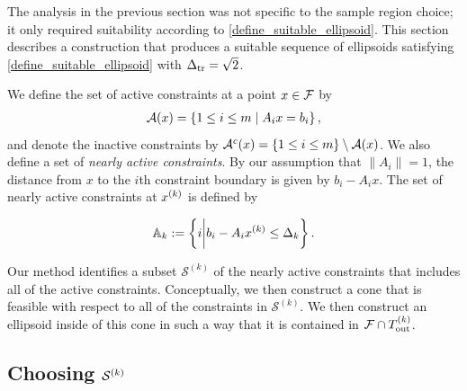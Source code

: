 \documentclass{article}
\begin{document}

The analysis in the previous section was not specific to the sample region choice; it only required suitability according to \cref{define_suitable_ellipsoid}.
This section describes a construction that produces a suitable sequence of ellipsoids satisfying \cref{define_suitable_ellipsoid} with $\Delta_{\textrm{tr}}=\sqrt{2}$.

We define the set of active constraints at a point $x \in {\mathcal F}$ by
\begin{align}
{\mathcal A}(x) = \left\{1 \le i \le m \; | \; {{A}}_ix = {{b}}_i \right\},\label{define_activei}
\end{align}
and denote the inactive constraints by ${\mathcal A}^c(x) = \left\{1 \le i \le m\right\} \setminus {\mathcal A}(x)$.   We also define a set of {\em nearly active constraints}.   By our assumption that $\|A_i\|=1$, the distance from $x$ to the $i$th constraint boundary is given by $b_i-A_i x$.  The set of nearly active constraints at $x^{(k)}$ is defined by

%
%
\begin{align}
{\mathbb A_{k}} := \left\{i \bigg| b_i-A_i x^{(k)} \le \Delta_k \right\}.
\label{define_activeconstraints}
\end{align}

Our method identifies a subset $\mathcal{S}^{(k)}$ of the nearly active constraints that includes all of the active constraints.   Conceptually,  we then construct a cone that is feasible with respect to all of the constraints in $\mathcal{S}^{(k)}$.   We then
construct an ellipsoid inside of this cone in such a way that it is contained in ${\mathcal F} \cap {T_{\text{out}}^{(k)}}$.  

\subsection{Choosing $\mathcal{S}^{(k)}$}
\label{Choosing_activeconstraints}
\end{document}
